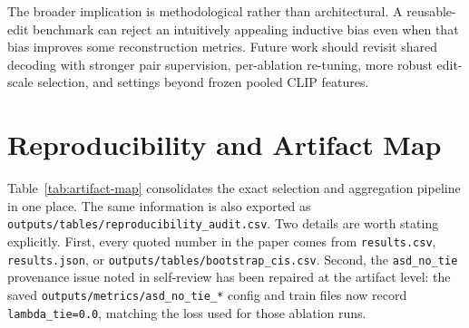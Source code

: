 \documentclass{article}
\begin{document}
The broader implication is methodological rather than architectural. A reusable-edit benchmark can reject an intuitively appealing inductive bias even when that bias improves some reconstruction metrics. Future work should revisit shared decoding with stronger pair supervision, per-ablation re-tuning, more robust edit-scale selection, and settings beyond frozen pooled CLIP features.

\appendix
\section{Reproducibility and Artifact Map}
\label{app:repro}

Table~\ref{tab:artifact-map} consolidates the exact selection and aggregation pipeline in one place. The same information is also exported as \texttt{outputs/tables/reproducibility\_audit.csv}. Two details are worth stating explicitly. First, every quoted number in the paper comes from \texttt{results.csv}, \texttt{results.json}, or \texttt{outputs/tables/bootstrap\_cis.csv}. Second, the \texttt{asd\_no\_tie} provenance issue noted in self-review has been repaired at the artifact level: the saved \texttt{outputs/metrics/asd\_no\_tie\_*} config and train files now record \texttt{lambda\_tie=0.0}, matching the loss used for those ablation runs.
\end{document}
